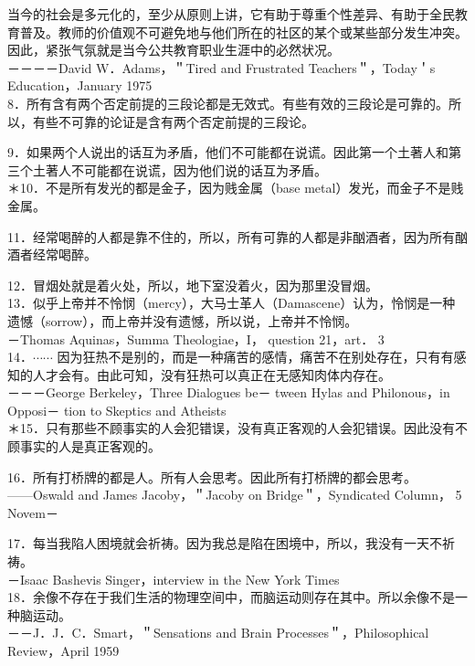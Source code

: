 当今的社会是多元化的，至少从原则上讲，它有助于尊重个性差异、有助于全民教育普及。教师的价值观不可避免地与他们所在的社区的某个或某些部分发生冲突。因此，紧张气氛就是当今公共教育职业生涯中的必然状况。\\
－－－－David W．Adams，＂Tired and Frustrated Teachers＂，Today＇s Education，January 1975\\
8．所有含有两个否定前提的三段论都是无效式。有些有效的三段论是可靠的。所以，有些不可靠的论证是含有两个否定前提的三段论。

9．如果两个人说出的话互为矛盾，他们不可能都在说谎。因此第一个土著人和第三个土著人不可能都在说谎，因为他们说的话互为矛盾。\\
＊10．不是所有发光的都是金子，因为贱金属（base metal）发光，而金子不是贱金属。

11．经常喝醉的人都是靠不住的，所以，所有可靠的人都是非酗酒者，因为所有酗酒者经常喝醉。

12．冒烟处就是着火处，所以，地下室没着火，因为那里没冒烟。\\
13．似乎上帝并不怜悯（mercy），大马士革人（Damascene）认为，怜悯是一种遗憾（sorrow），而上帝并没有遗憾，所以说，上帝并不怜悯。\\
－Thomas Aquinas，Summa Theologiae，I， question 21，art． 3\\
14．$\cdots \cdots$ 因为狂热不是别的，而是一种痛苦的感情，痛苦不在别处存在，只有有感知的人才会有。由此可知，没有狂热可以真正在无感知肉体内存在。\\
－－－George Berkeley，Three Dialogues be－ tween Hylas and Philonous，in Opposi－ tion to Skeptics and Atheists\\
＊15．只有那些不顾事实的人会犯错误，没有真正客观的人会犯错误。因此没有不顾事实的人是真正客观的。

16．所有打桥牌的都是人。所有人会思考。因此所有打桥牌的都会思考。\\
——Oswald and James Jacoby，＂Jacoby on Bridge＂，Syndicated Column， 5 Novem－

17．每当我陷人困境就会祈祷。因为我总是陷在困境中，所以，我没有一天不祈祷。\\
－Isaac Bashevis Singer，interview in the New York Times\\
18．余像不存在于我们生活的物理空间中，而脑运动则存在其中。所以余像不是一种脑运动。\\
－－J．J．C．Smart，＂Sensations and Brain Processes＂，Philosophical Review，April 1959

